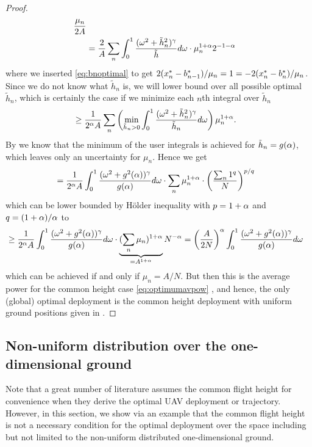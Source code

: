 \documentclass[smallabstract,smallcaptions]{dccpaper}
\newcounter{example}[section]
\newcommand{\junstart}{\color{black}}
\begin{document}
\begin{proof}
\begin{align}
    \frac{\mu_n}{2A}\\
    &=\frac{2}{A}\sum_n \int_0^1 \frac{(\omega^2+\tilde{h}^2_n)^{\gamma}}{\tilde{h}}d \omega \cdot \mu_n^{1+\alpha} 2^{-1-\alpha}
  \end{align}
  where we inserted \eqref{eq:bnoptimal} to get $2(x^{*}_n-b_{n-1}^*)/\mu_n=1=-2(x^{*}_n-b_{n}^*)/\mu_n$.
  Since we do not know what $\tilde{h}_n$ is, we will lower bound over all possible optimal $\tilde{h}_n$, which is
  certainly the case if we minimize each $n$th integral over $\tilde{h}_n$
  \begin{align}
    &\geq\frac{1}{2^{\alpha}A}\sum_n \left(\min_{\tilde{h}_n>0}\int_0^1 \frac{(\omega^2+\tilde{h}^2_n)^{\gamma}}{\tilde{h}_n}d \omega\right)
    \mu_n^{1+\alpha}.
\end{align}
%
By  we know that the minimum of the user integrals is  achieved for $\tilde{h}_n=g(\alpha)$, which leaves
only an uncertainty for $\mu_n$. Hence we get
%
\begin{align}
  &=\frac{1}{2^{\alpha}A} \int_0^1 \frac{(\omega^2+g^2(\alpha))^{\gamma}}{g(\alpha)}d\omega\cdot \sum_n \mu_n^{1+\alpha}\cdot \left(\frac{\sum_n
  1^q}{N}\right)^{p/q}
\end{align}
%
which can be lower bounded by Hölder inequality with $p=1+\alpha$ and $q=(1+\alpha)/\alpha$ to
%
\begin{align}
  &\geq\frac{1}{2^{\alpha}A} 
  \int_0^1 \frac{(\omega^2+g^2(\alpha))^{\gamma}}{g(\alpha)}d\omega\cdot\underbrace{ (\sum_n
    \mu_n)^{1+\alpha}}_{=A^{1+\alpha}} N^{-\alpha}
    =  \left(\frac{A}{2N}\right)^{\alpha}  \int_0^1 \frac{(\omega^2+g^2(\alpha))^{\gamma}}{g(\alpha)}d\omega
\end{align}
%
which can be achieved if and only if $\mu_n=A/N$. But then this is the average power for the common height case
\eqref{eq:optimumavpow} , and hence, the only (global) optimal deployment is  the common height deployment with uniform
ground positions given in . 
%
\end{proof}
\color{black}


\junstart
\subsection{Non-uniform distribution over the one-dimensional ground}
%
Note that a great number of literature assumes the common flight height for convenience when they derive the optimal UAV
deployment or trajectory.  However, in this section, we show via an example that the common flight height is not a
necessary condition for the optimal deployment over the space including but not limited to the non-uniform distributed
one-dimensional ground.
\end{document}
